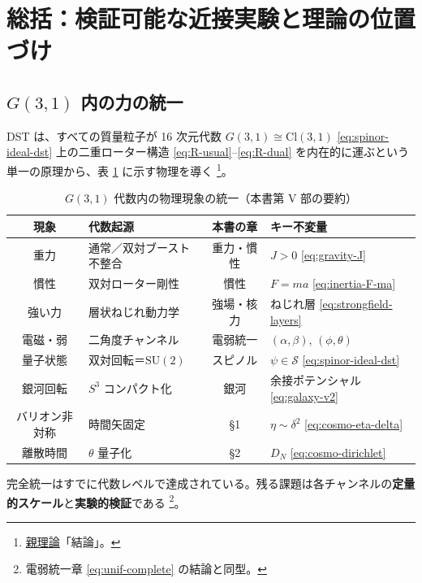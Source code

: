 \documentclass[dvipdfmx,a4paper,oneside]{jsbook}
\numberwithin{equation}{chapter}
\begin{document}
\section{総括：検証可能な近接実験と理論の位置づけ}

\subsection{\(G(3,1)\) 内の力の統一}

DST は、すべての質量粒子が 16 次元代数 \(G(3,1) \cong \mathrm{Cl}(3,1)\) \eqref{eq:spinor-ideal-dst} 上の二重ローター構造 \eqref{eq:R-usual}–\eqref{eq:R-dual} を内在的に運ぶという単一の原理から、表 \ref{tab:cosmo-unification} に示す物理を導く \footnote{\hyperref[sec:sister-manuscripts]{親理論}「結論」。}。

\begin{table}[htbp]
  \centering
  \caption{\(G(3,1)\) 代数内の物理現象の統一（本書第 V 部の要約）}
  \label{tab:cosmo-unification}
  \begin{tabular}{@{}clcl@{}}
    \toprule
    現象 & 代数起源 & 本書の章 & キー不変量 \\
    \midrule
    重力 & 通常／双対ブースト不整合 & 重力・慣性 & \(J > 0\) \eqref{eq:gravity-J} \\
    慣性 & 双対ローター剛性 & 慣性 & \(F = ma\) \eqref{eq:inertia-F-ma} \\
    強い力 & 層状ねじれ動力学 & 強場・核力 & ねじれ層 \eqref{eq:strongfield-layers} \\
    電磁・弱 & 二角度チャンネル & 電弱統一 & \((\alpha,\beta)\), \((\phi,\theta)\) \\
    量子状態 & 双対回転＝\(\mathrm{SU}(2)\) & スピノル & \(\psi \in \mathcal{S}\) \eqref{eq:spinor-ideal-dst} \\
    銀河回転 & \(S^3\) コンパクト化 & 銀河 & 余接ポテンシャル \eqref{eq:galaxy-v2} \\
    バリオン非対称 & 時間矢固定 & §1 & \(\eta \sim \delta^2\) \eqref{eq:cosmo-eta-delta} \\
    離散時間 & \(\theta\) 量子化 & §2 & \(D_N\) \eqref{eq:cosmo-dirichlet} \\
    \bottomrule
  \end{tabular}
\end{table}

完全統一はすでに代数レベルで達成されている。残る課題は各チャンネルの\textbf{定量的スケール}と\textbf{実験的検証}である \footnote{電弱統一章 \eqref{eq:unif-complete} の結論と同型。}。
\end{document}
